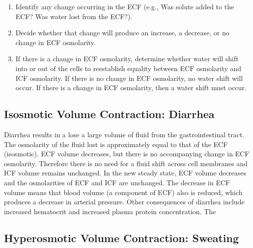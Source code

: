 \begin{enumerate}
\item Identify any change occurring in the ECF (e.g., Was solute added to the ECF? Was water lost from the ECF?).
\item Decide whether that change will produce an increase, a decrease, or no change in ECF osmolarity. 
\item If there is a change in ECF osmolarity, determine whether water will shift into or out of the cells to reestablish equality between ECF osmolarity and ICF osmolarity. If there is no change in ECF osmolarity, no water shift will occur. If there is a change in ECF osmolarity, then a water shift must occur. 
\end{enumerate}

\subsection{Isosmotic Volume Contraction: Diarrhea}

Diarrhea results in a lose a large volume of fluid from the gastrointestinal tract. The osmolarity of the fluid lost is approximately equal to that of the ECF (isosmotic).  ECF volume decreases, but there is no accompanying change in ECF osmolarity. Therefore there is no need for a fluid shift across cell membranes and ICF volume remains unchanged. In the new steady state, ECF volume decreases and the osmolarities of ECF and ICF are unchanged. The decrease in ECF volume means that blood volume (a component of ECF) also is reduced, which produces a decrease in arterial pressure. Other consequences of diarrhea include increased hematocrit and increased plasma protein concentration. The

\subsection{Hyperosmotic Volume Contraction: Sweating}

